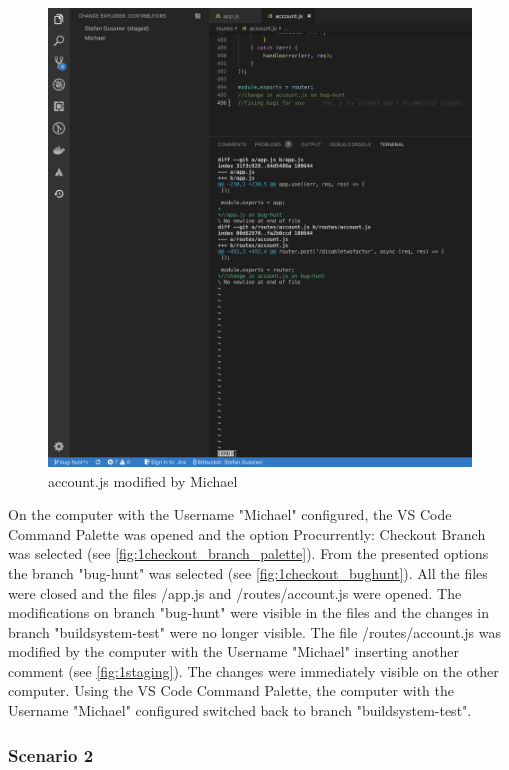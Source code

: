 \begin{figure}[h]
    \centering
    \includegraphics[width=1\textwidth]{figures/screenshots/scenarios/1staging_view.png}
    \caption{account.js modified by Michael}
    \label{fig:1staging}
\end{figure}

On the computer with the Username "Michael" configured, the VS Code Command Palette was opened and the option Procurrently: Checkout Branch was selected (see \autoref{fig:1checkout_branch_palette}). From the presented options the branch "bug-hunt" was selected (see \autoref{fig:1checkout_bughunt}). All the files were closed and the files /app.js and /routes/account.js were opened. The modifications on branch "bug-hunt" were visible in the files and the changes in branch "buildsystem-test" were no longer visible. The file /routes/account.js was modified by the computer with the Username "Michael" inserting another comment (see \autoref{fig:1staging}). The changes were immediately visible on the other computer. Using the VS Code Command Palette, the computer with the Username "Michael" configured switched back to branch "buildsystem-test".

\subsubsection{Scenario 2}

